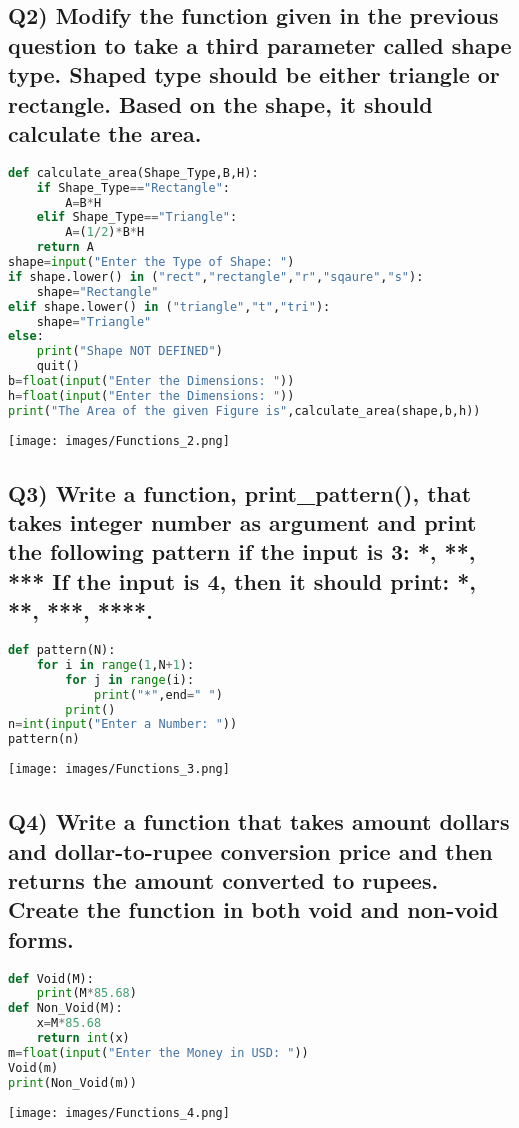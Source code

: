\documentclass{article}
\begin{document}
\subsection*{Q2) Modify the function given in the previous question to take a third parameter called shape type. Shaped type should be either triangle or rectangle. Based on the shape, it should calculate the area.}
\begin{lstlisting}[language=Python]
def calculate_area(Shape_Type,B,H):
    if Shape_Type=="Rectangle":
        A=B*H
    elif Shape_Type=="Triangle":
        A=(1/2)*B*H
    return A
shape=input("Enter the Type of Shape: ")
if shape.lower() in ("rect","rectangle","r","sqaure","s"):
    shape="Rectangle"
elif shape.lower() in ("triangle","t","tri"):
    shape="Triangle"
else:
    print("Shape NOT DEFINED")
    quit()
b=float(input("Enter the Dimensions: "))
h=float(input("Enter the Dimensions: "))
print("The Area of the given Figure is",calculate_area(shape,b,h))
\end{lstlisting}
\texttt{[image: images/Functions\_2.png]}

\subsection*{Q3) Write a function, print\_pattern(), that takes integer number as argument and print the following pattern if the input is 3: *, **, *** If the input is 4, then it should print: *, **, ***, ****.}
\begin{lstlisting}[language=Python]
def pattern(N):
    for i in range(1,N+1):
        for j in range(i):
            print("*",end=" ")
        print()
n=int(input("Enter a Number: "))
pattern(n)
\end{lstlisting}
\texttt{[image: images/Functions\_3.png]}

\subsection*{Q4) Write a function that takes amount dollars and dollar-to-rupee conversion price and then returns the amount converted to rupees. Create the function in both void and non-void forms.}
\begin{lstlisting}[language=Python]
def Void(M):
    print(M*85.68)
def Non_Void(M):
    x=M*85.68
    return int(x)
m=float(input("Enter the Money in USD: "))
Void(m)
print(Non_Void(m))
\end{lstlisting}
\texttt{[image: images/Functions\_4.png]}
\end{document}
